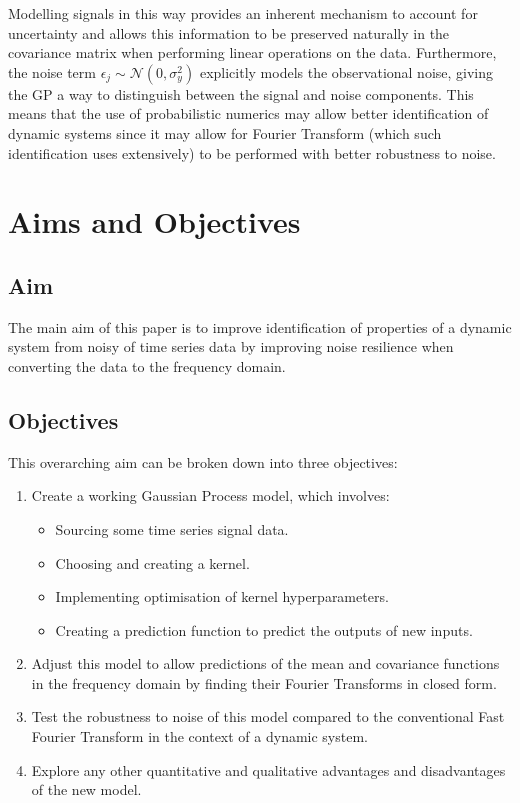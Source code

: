 \documentclass[12pt]{article}
\begin{document}
    Modelling signals in this way provides an inherent mechanism to account for uncertainty and allows this information to be preserved naturally in the covariance matrix when performing linear operations on the data.
    Furthermore, the noise term  $\epsilon_j \sim \mathcal{N}(0, \sigma^2_y)$ explicitly models the observational noise, giving the GP a way to distinguish between the signal and noise components.
    This means that the use of probabilistic numerics may allow better identification of dynamic systems since it may allow for Fourier Transform  (which such identification uses extensively) to be performed with better robustness to noise.

    \section{Aims and Objectives}
    \subsection{Aim}
    The main aim of this paper is to improve identification of properties of a dynamic system from noisy of time series data by improving noise resilience when converting the data to the frequency domain.

    \subsection{Objectives}
    This overarching aim can be broken down into three objectives:
        \begin{enumerate}
            \item Create a working Gaussian Process model, which involves:
                \begin{itemize}
                    \item Sourcing some time series signal data.
                    \item Choosing and creating a kernel.
                    \item Implementing optimisation of kernel hyperparameters. \label{item:nll}
                    \item Creating a prediction function to predict the outputs of new inputs. \label{item:predict}
                \end{itemize}
            \item Adjust this model to allow predictions of the mean and covariance functions in the frequency domain by finding their Fourier Transforms in closed form. \label{item:FT}
            \item Test the robustness to noise of this model compared to the conventional Fast Fourier Transform in the context of a dynamic system. \label{noise-resilience}
            \item Explore any other quantitative and qualitative advantages and disadvantages of the new model.
        \end{enumerate}
\end{document}
